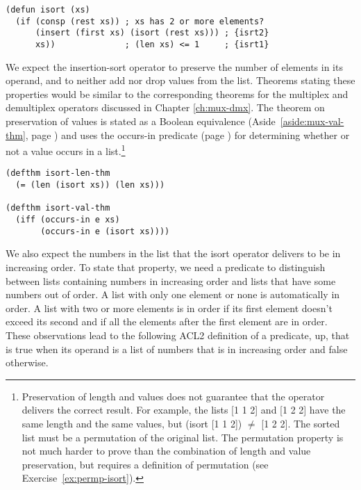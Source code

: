 \label{defun:isort}
\begin{Verbatim}
(defun isort (xs)
  (if (consp (rest xs)) ; xs has 2 or more elements?
      (insert (first xs) (isort (rest xs))) ; {isrt2}
      xs))              ; (len xs) <= 1     ; {isrt1}
\end{Verbatim}

We expect the insertion-sort operator to preserve
the number of elements in its operand, and to
neither add nor drop values from the list.
Theorems stating these properties would be
similar to the corresponding theorems for
the multiplex and demultiplex operators discussed
in Chapter \ref{ch:mux-dmx}.
The theorem on preservation of values is
stated as a
Boolean
equivalence
(Aside~\ref{aside:mux-val-thm}, page \pageref{aside:mux-val-thm})
and uses the \textsf{occurs-in }predicate
(page \pageref{def:occurs-in}) for determining
whether or not a value occurs in a list.\footnote{Preservation
of length and values does not guarantee
that the operator delivers the correct result.
For example, the lists \textsf{[1 1 2]} and \textsf{[1 2 2]} have the
same length and the same values,
but \textsf{(isort [1 1 2]) $\neq$ [1 2 2]}.
The sorted list must be a permutation of the original list.
The permutation property is not much harder
to prove than the combination of length and value preservation,
but requires a definition of permutation
(see Exercise~\ref{ex:permp-isort}).}

\label{defthm:isort-len}
\label{defthm:isort-val}
\begin{Verbatim}
(defthm isort-len-thm
  (= (len (isort xs)) (len xs)))

(defthm isort-val-thm
  (iff (occurs-in e xs)
       (occurs-in e (isort xs))))
\end{Verbatim}

We also expect the numbers in the list
that the \textsf{isort} operator
delivers to be in increasing order.
To state that property, we need a predicate
to distinguish between lists containing numbers in increasing order
and lists that have some numbers out of order.
A list with only one element or none is automatically in order.
A list with two or more elements is in order
if its first element doesn't exceed its second and if
all the elements after the first element are in order.
These observations lead to the following
ACL2 definition of a predicate, \textsf{up},
that is true when its operand is a list
of numbers that is in increasing order and false otherwise.

